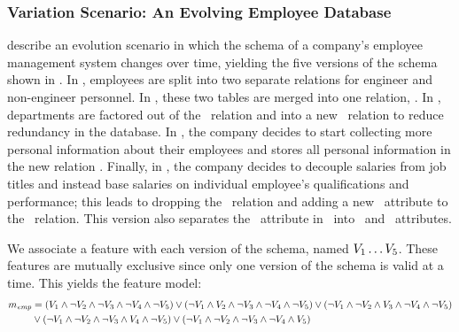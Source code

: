 \subsubsection{Variation Scenario: An Evolving Employee Database}
\label{sec:emp-scenario}



\citet{prima08Moon} describe an evolution scenario in which the schema of a
company's employee management system changes over time, yielding the five
versions of the schema shown in .
%
In \vOne, employees are split into two separate relations for
engineer and non-engineer personnel.
%
In \vTwo, these two tables are merged into one relation, \empacct.
%
In \vThree, departments are factored out of the \empacct\ relation and
into a new \dept\ relation to reduce redundancy in the database.
%
In \vFour, the company decides to start collecting more personal
information about their employees and stores all personal information in the
new relation \empbio.
%
Finally, in \vFive, the company decides to decouple salaries from
job titles and instead base salaries on individual employee's qualifications
and performance; this leads to dropping the \job\ relation and adding a new
\salary\ attribute to the \empacct\ relation. This version also separates the
\name\ attribute in \empbio\ into \fname\ and \lname\ attributes.


We associate a feature with each version of the schema, named 
$\vOne\ldots\vFive$.
%
These features are mutually exclusive since only one version of the
schema is valid at a time. This yields the  feature model:
%
%
\begin{align*}
\fModel_\employee
  &=   \left(\vOne\wedge\neg\vTwo\wedge\neg\vThree\wedge\neg\vFour\wedge\neg\vFive\right)
\vee\left(\neg\vOne\wedge\vTwo\wedge\neg\vThree\wedge\neg\vFour\wedge\neg\vFive\right)
  \vee\left(\neg\vOne\wedge\neg\vTwo\wedge\vThree\wedge\neg\vFour\wedge\neg\vFive\right)\\
   &
\vee\left(\neg\vOne\wedge\neg\vTwo\wedge\neg\vThree\wedge\vFour\wedge\neg\vFive\right)
  \vee\left(\neg\vOne\wedge\neg\vTwo\wedge\neg\vThree\wedge\neg\vFour\wedge\vFive\right)
\end{align*}

